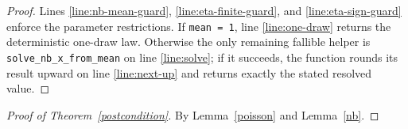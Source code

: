 \documentclass{article}
\begin{document}
\begin{proof}
Lines \ref{line:nb-mean-guard}, \ref{line:eta-finite-guard}, and \ref{line:eta-sign-guard}
enforce the parameter restrictions. If \texttt{mean = 1}, line
\ref{line:one-draw} returns the deterministic one-draw law.
Otherwise the only remaining fallible helper is
\texttt{solve\_nb\_x\_from\_mean} on line \ref{line:solve}; if it succeeds, the function rounds
its result upward on line \ref{line:next-up} and returns exactly the stated resolved value.
\end{proof}

\begin{proof}[Proof of Theorem~\ref{postcondition}]
By Lemma~\ref{poisson} and Lemma~\ref{nb}.
\end{proof}
\end{document}
